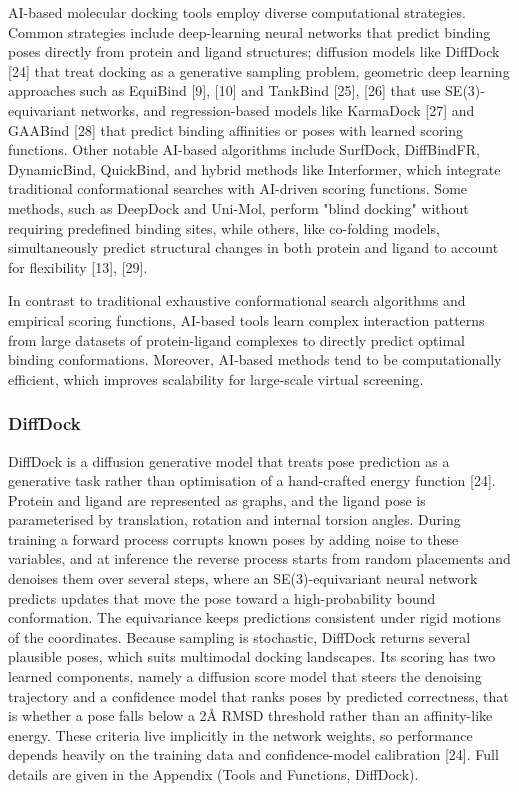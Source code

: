 AI-based molecular docking tools employ diverse computational strategies. Common strategies include deep-learning neural networks that predict binding poses directly from protein and ligand structures; diffusion models like DiffDock {[}24{]} that treat docking as a generative sampling problem, geometric deep learning approaches such as EquiBind {[}9{]}, {[}10{]} and TankBind {[}25{]}, {[}26{]} that use SE(3)-equivariant networks, and regression-based models like KarmaDock {[}27{]} and GAABind {[}28{]} that predict binding affinities or poses with learned scoring functions. Other notable AI-based algorithms include SurfDock, DiffBindFR, DynamicBind, QuickBind, and hybrid methods like Interformer, which integrate traditional conformational searches with AI-driven scoring functions. Some methods, such as DeepDock and Uni-Mol, perform "blind docking" without requiring predefined binding sites, while others, like co-folding models, simultaneously predict structural changes in both protein and ligand to account for flexibility {[}13{]}, {[}29{]}.

In contrast to traditional exhaustive conformational search algorithms and empirical scoring functions, AI-based tools learn complex interaction patterns from large datasets of protein-ligand complexes to directly predict optimal binding conformations. Moreover, AI-based methods tend to be computationally efficient, which improves scalability for large-scale virtual screening.

\hypertarget{diffdock}{%
\subsubsection{DiffDock}\label{diffdock}}

DiffDock is a diffusion generative model that treats pose prediction as a generative task rather than optimisation of a hand-crafted energy function {[}24{]}. Protein and ligand are represented as graphs, and the ligand pose is parameterised by translation, rotation and internal torsion angles. During training a forward process corrupts known poses by adding noise to these variables, and at inference the reverse process starts from random placements and denoises them over several steps, where an SE(3)-equivariant neural network predicts updates that move the pose toward a high-probability bound conformation. The equivariance keeps predictions consistent under rigid motions of the coordinates. Because sampling is stochastic, DiffDock returns several plausible poses, which suits multimodal docking landscapes. Its scoring has two learned components, namely a diffusion score model that steers the denoising trajectory and a confidence model that ranks poses by predicted correctness, that is whether a pose falls below a 2Å RMSD threshold rather than an affinity-like energy. These criteria live implicitly in the network weights, so performance depends heavily on the training data and confidence-model calibration {[}24{]}. Full details are given in the Appendix (Tools and Functions, DiffDock).

